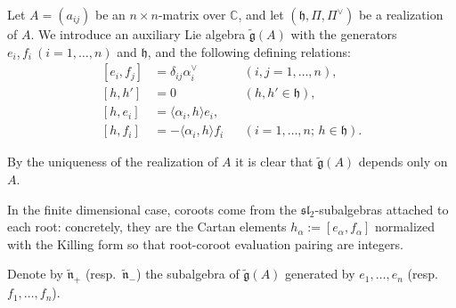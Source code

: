 \documentclass[12pt]{article}
\begin{document}
\begin{definition}
     Let $A = (a_{ij})$ be an $n \times n$-matrix over $\mathbb{C}$, and let
    $(\mathfrak{h}, \Pi, \Pi^\vee)$ be a realization of $A$. We introduce
    an auxiliary Lie algebra $\tilde{\mathfrak{g}}(A)$ with the generators
    $e_i, f_i \ (i=1,\dots,n)$ and $\mathfrak{h}$, and the following defining relations:
    \[
        \begin{aligned}
            [e_i, f_j] & = \delta_{ij}\alpha_i^\vee         &  & (i,j=1,\dots,n),                     \\
            [h,h']     & = 0                                &  & (h,h' \in \mathfrak{h}),             \\
            [h, e_i]   & = \langle \alpha_i, h \rangle e_i,                                           \\
            [h, f_i]   & = -\langle \alpha_i, h \rangle f_i &  & (i=1,\dots,n;\, h \in \mathfrak{h}).
        \end{aligned}
    \]

    By the uniqueness of the realization of $A$ it is clear that
    $\tilde{\mathfrak{g}}(A)$ depends only on $A$.
\end{definition}

\begin{remark}
     In the finite dimensional case, coroots come from the $\mathfrak{sl}_2$-subalgebras attached to each root: concretely, they are the Cartan elements $h_\alpha := [e_\alpha, f_\alpha]$ normalized with the Killing form so that root-coroot evaluation pairing are integers.
\end{remark}

Denote by $\tilde{\mathfrak{n}}_+$ (resp.\ $\tilde{\mathfrak{n}}_-$) the subalgebra of $\tilde{\mathfrak{g}}(A)$ generated by $e_1,\dots,e_n$ (resp.\ $f_1,\dots,f_n$).
\end{document}
